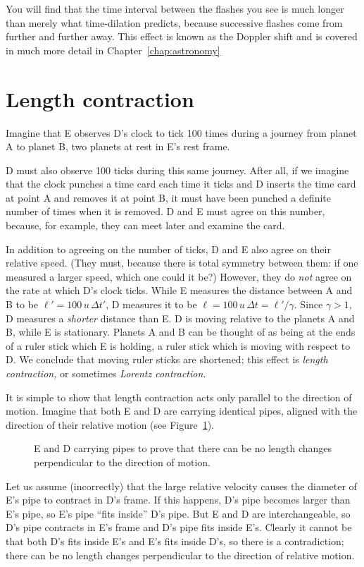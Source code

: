 You will find that the time interval between the flashes you see is
much longer than merely what time-dilation predicts, because
successive flashes come from further and further away.  This effect is
known as the Doppler shift and is covered in much more detail in
Chapter~\ref{chap:astronomy}


\section{Length contraction}
\label{sec:lengthcontraction}

Imagine that E observes D's clock to tick 100 times during a journey
from planet A to planet B, two planets at rest in E's rest frame.

D must also observe 100 ticks during this same journey.  After all, if
we imagine that the clock punches a time card each time it ticks and D
inserts the time card at point A and removes it at point B, it must
have been punched a definite number of times when it is removed.  D
and E must agree on this number, because, for example, they can meet
later and examine the card.

In addition to agreeing on the number of ticks, D and E also agree on
their relative speed.  (They must, because there is total symmetry
between them: if one measured a larger speed, which one could it be?)
However, they do {\em not\/} agree on the rate at which D's clock
ticks.  While E measures the distance between A and B to be
$\ell'=100\, u\,\Delta t'$, D measures it to be $\ell=100\, u\,\Delta
t=\ell'/\gamma$.  Since $\gamma >1$, D measures a {\em shorter\/}
distance than E.  D is moving relative to the planets A and B, while E
is stationary.  Planets A and B can be thought of as being at the ends
of a ruler stick which E is holding, a ruler stick which is moving
with respect to D.  We conclude that moving ruler sticks are
shortened; this effect is {\em length contraction,\/} or sometimes
{\em Lorentz contraction.\/}

It is simple to show that length contraction acts only parallel to the
direction of motion.  Imagine that both E and D are carrying identical
pipes, aligned with the direction of their relative motion (see
Figure~\ref{fig:pipes}).
\begin{figure}
\caption[E and D carrying pipes]{E and D carrying pipes to prove that
there can be no length changes perpendicular to the direction of
motion.}
\label{fig:pipes}
\end{figure}
Let us assume (incorrectly) that the large relative velocity causes
the diameter of E's pipe to contract in D's frame.  If this happens,
D's pipe becomes larger than E's pipe, so E's pipe ``fits inside'' D's
pipe.  But E and D are interchangeable, so D's pipe contracts in E's
frame and D's pipe fits inside E's.  Clearly it cannot be that both
D's fits inside E's and E's fits inside D's, so there is a
contradiction; there can be no length changes perpendicular to the
direction of relative motion.

